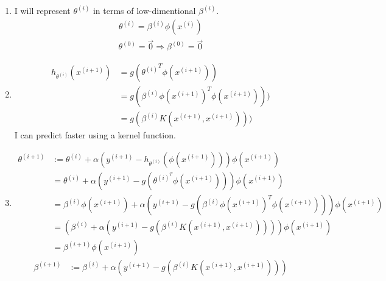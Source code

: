 \begin{answer}
\begin{enumerate}
\item
I will represent $\theta^{(i)}$ in terms of low-dimentional  $\beta^{(i)}$.
\begin{align*}
\theta^{(i)}=\beta^{(i)}\phi(x^{(i)})
\end{align*}
\begin{align*}
\theta^{(0)}=\vec{0}\Rightarrow\beta^{(0)}=\vec{0}
\end{align*}
\item
\begin{align*}
h_{\theta^{(i)}}(x^{(i+1)})&= g({\theta^{(i)}}^T \phi(x^{(i+1)}))\\
&=g(\beta^{(i)}\phi(x^{(i+1)})^T\phi(x^{(i+1)})))\\
&=g(\beta^{(i)}K(x^{(i+1)},x^{(i+1)})))
\end{align*}
I can predict faster using a kernel function.
\item
\begin{align*}
\theta^{(i+1)}&:=	  \theta^{(i)} + \alpha(y^{(i+1)} - h_{\theta^{(i)}}(\phi(x^{(i+1)})))\phi(x^{(i+1)})\\
&=\theta^{(i)} + \alpha(y^{(i+1)} -g(\theta^{(i)^T}\phi(x^{(i+1)})))\phi(x^{(i+1)})\\
&=\beta^{(i)}\phi(x^{(i+1)}) + \alpha(y^{(i+1)} -g(\beta^{(i)}\phi(x^{(i+1)})^T\phi(x^{(i+1)})))\phi(x^{(i+1)})\\
&=(\beta^{(i)}+ \alpha(y^{(i+1)} -g(\beta^{(i)}K(x^{(i+1)},x^{(i+1)}))))\phi(x^{(i+1)})\\
&=\beta^{(i+1)}\phi(x^{(i+1)})
\end{align*}
\begin{align*}
\beta^{(i+1)}&:=\beta^{(i)}+ \alpha(y^{(i+1)} -g(\beta^{(i)}K(x^{(i+1)},x^{(i+1)})))
\end{align*}
\end{enumerate}
\end{answer}
